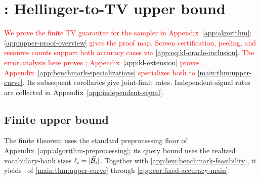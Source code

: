 \clearpage
\section{\HellingerCaseTitle: Hellinger-to-TV upper bound}
\label{app:upper-proof}

\textcolor{red}{We prove the finite TV guarantee for the sampler in
Appendix~\ref{app:algorithm}; \cref{app:upper-proof-overview} gives the proof map.
Screen certification, peeling, and resource counts support both accuracy
cases via \eqref{app:eq:kl-oracle-inclusion}. The error analysis here proves
\HellingerCase; Appendix~\ref{app:kl-extension} proves \KLCase.
Appendix~\ref{app:benchmark-specializations} specializes both to
\cref{main:thm:upper-curve}.}
\ifincludeexponents
Its subsequent corollaries give joint-limit rates.
\fi
\ifincludeexponents
Independent-signal rates are collected in
Appendix~\ref{app:independent-signal}.
\fi

\subsection{Finite upper bound}
\label{app:results-upper}

The finite theorem uses the standard preprocessing floor of
Appendix~\ref{app:algorithm-preprocessing}; its query bound uses the realized
vocabulary-bank sizes $\ell_{i}=|\widehat{\mathcal B}_{i}|$.
Together with \cref{app:lem:benchmark-feasibility}, it yields
\HellingerCase\ of \cref{main:thm:upper-curve} through
\cref{app:cor:fixed-accuracy-main}.

